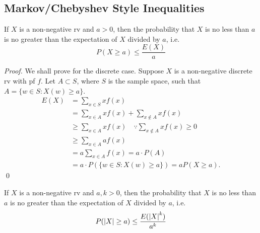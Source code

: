 \documentclass[notoc,notitlepage]{tufte-book}
\begin{document}
\subsection{Markov/Chebyshev Style Inequalities}%
\label{sub:markov_chebyshev_style_inequalities}

\begin{thm}
\label{thm:markov_s_inequality}
  If $X$ is a non-negative rv and $a > 0$, then the probability that $X$ is no less than $a$ is no greater than the expectation of $X$ divided by $a$, i.e.
  \begin{equation}\label{eq:markov_s_inequality}
    P(X \geq a) \leq \frac{E(X)}{a}
  \end{equation}
\end{thm}

\begin{proof}
  We shall prove for the discrete case. Suppose $X$ is a non-negative discrete rv with pf $f$. Let $A \subset S$, where $S$ is the sample space, such that \\\noindent$A = \{w \in S : X(w) \geq a\}$.
  \begin{align*}
    E(X) &= \sum_{x \in S} x f(x) \\
         &= \sum_{x \in A} xf(x) + \sum_{x \notin A} xf(x) \\
         &\geq \sum_{x \in A} xf(x) \quad \because \sum_{x \notin A} xf(x) \geq 0  \\
         &\geq \sum_{x \in A} af(x) \\
         &= a \sum_{x \in A} f(x) = a \cdot P(A) \\
         &= a \cdot P(\{w \in S : X(w) \geq a\}) = a P(X \geq a).
  \end{align*}\qed
\end{proof}

\begin{thm}
\label{thm:markov_s_inequality_2}
  If $X$ is a non-negative rv and $a, k > 0$, then the probability that $X$ is no less than $a$ is no greater than the expectation of $X$ divided by $a$, i.e.
  \begin{equation}\label{eq:markov_s_inequality_2}
    P(\left| X \right| \geq a) \leq \frac{E(\left| X \right|^k)}{a^k}
  \end{equation}
\end{thm}
\end{document}

